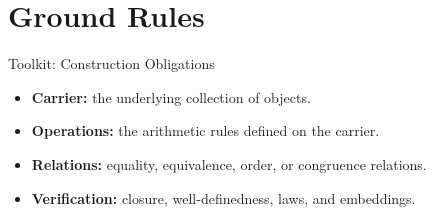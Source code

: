 \section{Ground Rules}
\begin{toolkitbox}{Toolkit: Construction Obligations}
\begin{itemize}
  \item \textbf{Carrier:} the underlying collection of objects.
  \item \textbf{Operations:} the arithmetic rules defined on the carrier.
  \item \textbf{Relations:} equality, equivalence, order, or congruence relations.
  \item \textbf{Verification:} closure, well-definedness, laws, and embeddings.
\end{itemize}
\end{toolkitbox}



